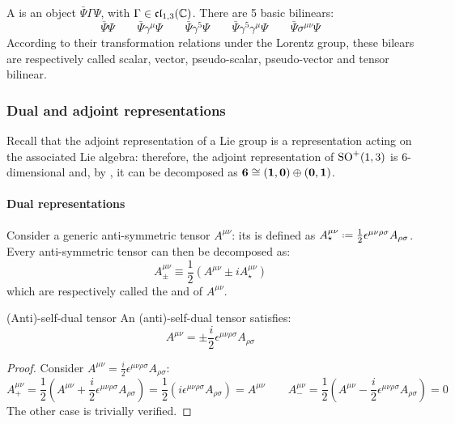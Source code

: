 A  is an object $ \bar{\Psi} \Gamma \Psi $, with $ \Gamma \in \mathfrak{cl}_{1,3}(\mathbb{C}) $. There are 5 basic bilinears:
\begin{equation*}
  \bar{\Psi} \Psi
  \qquad
  \bar{\Psi} \gamma^\mu \Psi
  \qquad
  \bar{\Psi} \gamma^5 \Psi
  \qquad
  \bar{\Psi} \gamma^5 \gamma^\mu \Psi
  \qquad
  \bar{\Psi} \sigma^{\mu \nu} \Psi
\end{equation*}
According to their transformation relations under the Lorentz group, these bilears are respectively called scalar, vector, pseudo-scalar, pseudo-vector and tensor bilinear.

\subsubsection{Dual and adjoint representations}

Recall that the adjoint representation of a Lie group is a representation acting on the associated Lie algebra: therefore, the adjoint representation of $ \mathrm{SO}^+(1,3) $ is 6-dimensional and, by , it can be decomposed as $ \mathbf{6} \cong \mathbf{\left( 1,0 \right)} \oplus \mathbf{\left( 0,1 \right)} $.

\paragraph{Dual representations}

Consider a generic anti-symmetric tensor $ A^{\mu \nu} $: its  is defined as $ A_\star^{\mu \nu} \defeq \frac{1}{2} \epsilon^{\mu \nu \rho \sigma} A_{\rho \sigma} $. Every anti-symmetric tensor can then be decomposed as:
\begin{equation}
  A^{\mu \nu}_{\pm} \equiv \frac{1}{2} \left( A^{\mu \nu} \pm i A_\star^{\mu \nu} \right)
\end{equation}
which are respectively called the  and  of $ A^{\mu \nu} $.

\begin{lemma}{(Anti)-self-dual tensor}{}
  An (anti)-self-dual tensor satisfies:
  \begin{equation}
    A^{\mu \nu} = \pm \frac{i}{2} \epsilon^{\mu \nu \rho \sigma} A_{\rho \sigma}
  \end{equation}
\end{lemma}

\begin{proofbox}
  \begin{proof}
    Consider $ A^{\mu \nu} = \frac{i}{2} \epsilon^{\mu \nu \rho \sigma} A_{\rho \sigma} $:
    \begin{equation*}
      A^{\mu \nu}_+ = \frac{1}{2} \left( A^{\mu \nu} + \frac{i}{2} \epsilon^{\mu \nu \rho \sigma} A_{\rho \sigma} \right) = \frac{1}{2} \left( i \epsilon^{\mu \nu \rho \sigma} A_{\rho \sigma} \right) = A^{\mu \nu}
      \qquad
      A^{\mu \nu}_- = \frac{1}{2} \left( A^{\mu \nu} - \frac{i}{2} \epsilon^{\mu \nu \rho \sigma} A_{\rho \sigma} \right) = 0
    \end{equation*}
    The other case is trivially verified.
  \end{proof}
\end{proofbox}

